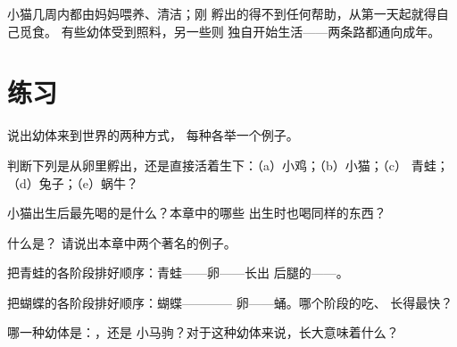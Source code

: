 \begin{remark}[奶水，还是直接自立]\label{rem:g2:animals-grow-up:care}
小猫几周内都由妈妈喂养、清洁；刚
孵出的得不到任何帮助，从第一天起就得自己觅食。
有些幼体受到照料，另一些则
独自开始生活——两条路都通向成年。
\end{remark}

\section{练习}

\begin{exercise}[$\star$]\label{exo:g2:animals-grow-up:1}
说出幼体来到世界的两种方式，
每种各举一个例子。
\end{exercise}

\begin{exercise}[$\star$]\label{exo:g2:animals-grow-up:2}
判断下列是从卵里孵出，还是直接活着生下：（a）小鸡；（b）小猫；（c）
青蛙；（d）兔子；（e）蜗牛？
\end{exercise}

\begin{exercise}[$\star$]\label{exo:g2:animals-grow-up:3}
小猫出生后最先喝的是什么？本章中的哪些
出生时也喝同样的东西？
\end{exercise}

\begin{exercise}[$\star$]\label{exo:g2:animals-grow-up:4}
什么是？
请说出本章中两个著名的例子。
\end{exercise}

\begin{exercise}[$\star$]\label{exo:g2:animals-grow-up:5}
把青蛙的各阶段排好顺序：青蛙——卵——长出
后腿的——。
\end{exercise}

\begin{exercise}[$\star$]\label{exo:g2:animals-grow-up:6}
把蝴蝶的各阶段排好顺序：蝴蝶————
卵——蛹。哪个阶段的吃、
长得最快？
\end{exercise}

\begin{exercise}[$\star$]\label{exo:g2:animals-grow-up:7}
哪一种幼体是：，还是
小马驹？对于这种幼体来说，长大意味着什么？
\end{exercise}

